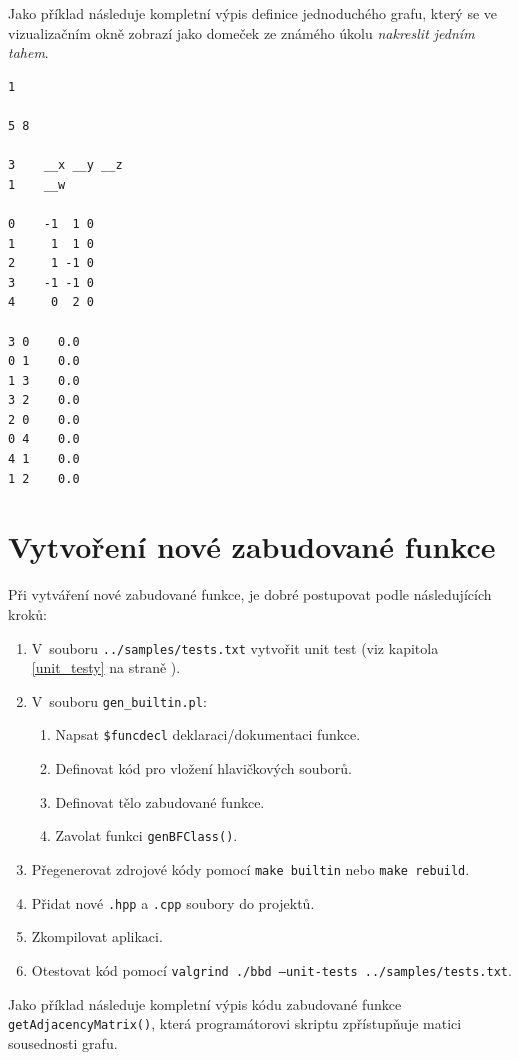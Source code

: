 \documentclass[11pt,twoside,a4paper]{book}
\begin{document}
Jako příklad následuje kompletní výpis definice jednoduchého grafu, který se ve vizualizačním okně zobrazí jako domeček ze známého úkolu \textit{nakreslit jedním tahem}.

\begin{verbatim}
1

5 8

3    __x __y __z
1    __w

0    -1  1 0
1     1  1 0
2     1 -1 0
3    -1 -1 0
4     0  2 0

3 0    0.0
0 1    0.0
1 3    0.0
3 2    0.0
2 0    0.0
0 4    0.0
4 1    0.0
1 2    0.0
\end{verbatim}



\chapter{Vytvoření nové zabudované funkce}
\label{vytvoreni_nove_zabudovane_funkce}

Při vytváření nové zabudované funkce, je dobré postupovat podle následujících kroků:

\begin{enumerate}
\item V~souboru \texttt{../samples/tests.txt} vytvořit unit test (viz kapitola \ref{unit_testy} na straně \pageref{unit_testy}).
\item V~souboru \texttt{gen\_builtin.pl}:
\begin{enumerate}
\item Napsat \texttt{\$funcdecl} deklaraci/dokumentaci funkce.
\item Definovat kód pro vložení hlavičkových souborů.
\item Definovat tělo zabudované funkce.
\item Zavolat funkci \texttt{genBFClass()}.
\end{enumerate}
\item Přegenerovat zdrojové kódy pomocí \texttt{make builtin} nebo \texttt{make rebuild}.
\item Přidat nové \texttt{.hpp} a \texttt{.cpp} soubory do projektů.
\item Zkompilovat aplikaci.
\item Otestovat kód pomocí \texttt{valgrind ./bbd --unit-tests ../samples/tests.txt}.
\end{enumerate}

Jako příklad následuje kompletní výpis kódu zabudované funkce \texttt{getAdjacencyMatrix()}, která pro\-gra\-má\-to\-ro\-vi skriptu zpřístupňuje matici sousednosti grafu.
\end{document}

